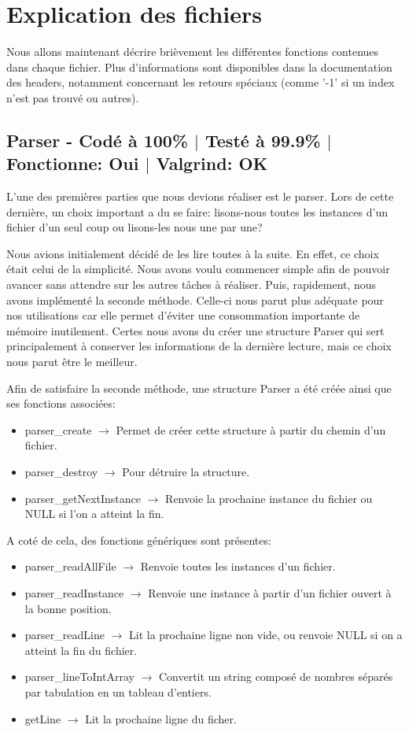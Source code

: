 \documentclass{EPUProjetPeiP}
\newcommand{\comp}[5]{
	\section[#1]{#1 {\small - Codé à #2\% $\vert$ Testé à #3\% $\vert$ Fonctionne: #4 $\vert$ Valgrind: #5}}
}
\begin{document}
\chapter{Explication des fichiers}
Nous allons maintenant décrire brièvement les différentes fonctions contenues dans chaque fichier. Plus d'informations sont disponibles dans la documentation des headers, notamment concernant les retours spéciaux (comme '-1' si un index n'est pas trouvé ou autres).

\comp{Parser}{100}{99.9}{Oui}{OK}
L'une des premières parties que nous devions réaliser est le parser. Lors de cette dernière, un choix important a du se faire: lisons-nous toutes les instances d'un fichier d'un seul coup ou lisons-les nous une par une?

Nous avions initialement décidé de les lire toutes à la suite. En effet, ce choix était celui de la simplicité. Nous avons voulu commencer simple afin de pouvoir avancer sans attendre sur les autres tâches à réaliser. Puis, rapidement, nous avons implémenté la seconde méthode. Celle-ci nous parut plus adéquate pour nos utilisations car elle permet d'éviter une consommation importante de mémoire inutilement. Certes nous avons du créer une structure Parser qui sert principalement à conserver les informations de la dernière lecture, mais ce choix nous parut être le meilleur.

Afin de satisfaire la seconde méthode, une structure Parser a été créée ainsi que ses fonctions associées:
\begin{itemize}
	\item parser\_create $\longrightarrow$ Permet de créer cette structure à partir du chemin d'un fichier.
	\item parser\_destroy $\longrightarrow$ Pour détruire la structure.
	\item parser\_getNextInstance $\longrightarrow$ Renvoie la prochaine instance du fichier ou NULL si l'on a atteint la fin.\\
\end{itemize}

A coté de cela, des fonctions génériques sont présentes:
\begin{itemize}
	\item parser\_readAllFile $\longrightarrow$ Renvoie toutes les instances d'un fichier.
	\item parser\_readInstance $\longrightarrow$ Renvoie une instance à partir d'un fichier ouvert à la bonne position. 
	\item parser\_readLine $\longrightarrow$ Lit la prochaine ligne non vide, ou renvoie NULL si on a atteint la fin du fichier.
	\item parser\_lineToIntArray $\longrightarrow$ Convertit un string composé de nombres séparés par tabulation en un tableau d'entiers.
	\item getLine $\longrightarrow$ Lit la prochaine ligne du ficher.
\end{itemize}
\end{document}
